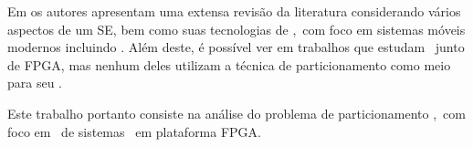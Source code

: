     
    Em \cite{Jozwiak2017} os autores apresentam uma extensa revisão da literatura considerando vários aspectos de um SE, bem como suas tecnologias de \design,\ com foco em sistemas móveis modernos incluindo \wearables.
    Além deste, é possível ver em \cite{Plessl2003, Ahola2007, Abdelhedi2016, Narumi2016, Lee2015} trabalhos que estudam \wearables\ junto de FPGA, mas nenhum deles utilizam a técnica de particionamento como meio para seu \design.
    
    Este trabalho portanto consiste na análise do problema de particionamento \hs,\ com foco em \design\ de sistemas \wearables\ em plataforma FPGA.
